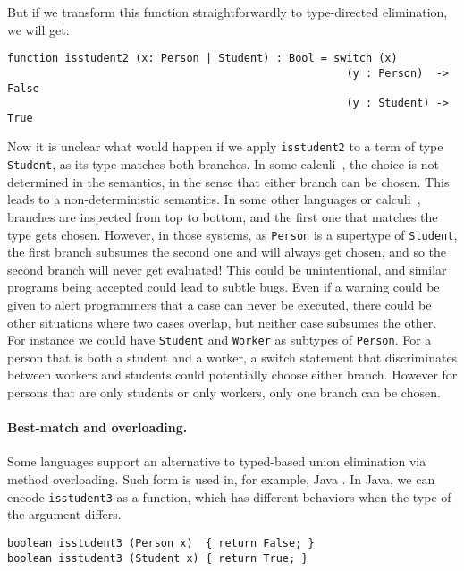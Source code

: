 \noindent But if we transform this function straightforwardly to type-directed
elimination, we will get:

\begin{lstlisting}
function isstudent2 (x: Person | Student) : Bool = switch (x)
                                                     (y : Person)  -> False
                                                     (y : Student) -> True
\end{lstlisting}

\noindent Now it is unclear what would happen if we apply \lstinline{isstudent2}
to a term of type \lstinline{Student}, as its type matches both branches. In
some calculi~\citep{dunfield2014elaborating}, the choice is not determined in
the semantics, in the sense that either branch can be chosen. This leads to a
non-deterministic semantics. In some other languages or
calculi~\citep{castagna:settheoretic}, branches are inspected from top to
bottom, and the first one that matches the type gets chosen. However, in those
systems, as \lstinline{Person} is a supertype of \lstinline{Student}, the first
branch subsumes the second one and will always get chosen, and so the second
branch will never get evaluated! This could be unintentional, and similar
programs being accepted could lead to subtle bugs. Even if a warning could be
given to alert programmers that a case can never be executed, there could be
other situations where two cases overlap, but neither case subsumes the other.
For instance we could have \lstinline{Student} and \lstinline{Worker} as
subtypes of \lstinline{Person}. For a person that is both a student and a
worker, a switch statement that discriminates between workers and students could
potentially choose either branch. However for persons that are only students or
only workers, only one branch can be chosen.

\paragraph{Best-match and overloading.}
Some languages support an alternative to typed-based union elimination via method
overloading. Such form is used in, for example, Java \cite{javadoc}. In Java, we
can encode \lstinline{isstudent3} as a function, which has different
behaviors when the type of the argument differs.

\begin{lstlisting}
boolean isstudent3 (Person x)  { return False; }
boolean isstudent3 (Student x) { return True; }
\end{lstlisting}

